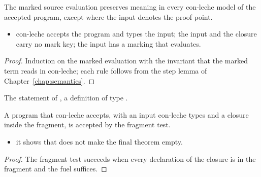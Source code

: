 \begin{theorem}
  \label{thm:EraseProof-srcEval_sound}
  \leanok
   The marked source evaluation preserves meaning in every con-leche model of the accepted program, except where the input denotes the proof point.
  \begin{itemize}
  \item {} con-leche accepts the program and types the input; the input and the closure carry no mark key; the input has a marking that evaluates.
  \end{itemize}
\end{theorem}
\begin{proof}
  \leanok
   Induction on the marked evaluation with the invariant that the marked term reads in con-leche; each rule follows from the step lemma of Chapter~\ref{chap:semantics}.
\end{proof}

\begin{definition}
  \label{def:EraseProof-collectDeps_ok_of-statement}
  \leanok
   The statement of , a definition of type .
\end{definition}

\begin{lemma}
  \label{lem:EraseProof-collectDeps_ok_of}
  \leanok
   A program that con-leche accepts, with an input con-leche types and a closure inside the fragment, is accepted by the fragment test.
  \begin{itemize}
  \item {} it shows that  does not make the final theorem empty.
  \end{itemize}
\end{lemma}
\begin{proof}
  \leanok
   The fragment test succeeds when every declaration of the closure is in the fragment and the fuel suffices.
\end{proof}


